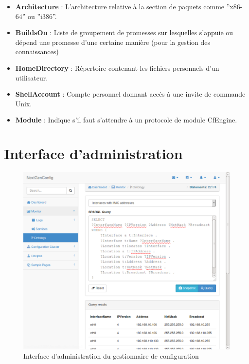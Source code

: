 \begin{itemize}
  \item \textbf{Architecture} : L'architecture relative à la section de paquets
	  comme ''x86-64'' ou ''i386''.
  \item \textbf{BuildsOn} : Liste de groupement de promesses sur lesquelles
	  s'appuie ou dépend une promesse d'une certaine manière (pour la
	  gestion des connaissances)
  \item \textbf{HomeDirectory} : Répertoire contenant les fichiers personnels
	  d'un utilisateur.
  \item \textbf{ShellAccount} : Compte personnel donnant accès à une invite de
	  commande Unix.
  \item \textbf{Module} : Indique s'il faut s'attendre à un protocole de module
	  CfEngine.
\end{itemize}

\chapter{Interface d'administration}

\begin{figure}[H]
    \centerline{\includegraphics[width=\textwidth]{img/trifle_gui}}
    \caption{Interface d'administration du gestionnaire de configuration}
    \label{fig:trifle_gui}
\end{figure}

